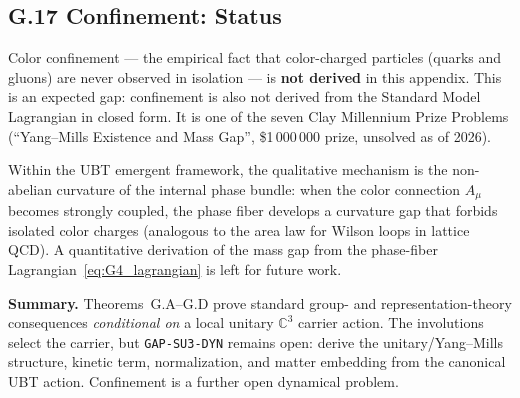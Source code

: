 \subsection*{G.17 Confinement: Status}
\label{sec:G17_confinement}

Color confinement — the empirical fact that color-charged particles (quarks and gluons) are
never observed in isolation — is \textbf{not derived} in this appendix.  This is an expected
gap: confinement is also not derived from the Standard Model Lagrangian in closed form.
It is one of the seven Clay Millennium Prize Problems (``Yang--Mills Existence and Mass Gap'',
\$1\,000\,000 prize, unsolved as of 2026).

Within the UBT emergent framework, the qualitative mechanism is the non-abelian curvature of
the internal phase bundle: when the color connection $A_\mu$ becomes strongly coupled, the
phase fiber develops a curvature gap that forbids isolated color charges (analogous to the
area law for Wilson loops in lattice QCD).  A quantitative derivation of the mass gap from
the phase-fiber Lagrangian~\eqref{eq:G4_lagrangian} is left for future work.

\textbf{Summary.}  Theorems~G.A--G.D prove standard group- and representation-theory consequences \emph{conditional on} a local unitary $\mathbb{C}^3$ carrier action.  The involutions select the carrier, but \texttt{GAP-SU3-DYN} remains open: derive the unitary/Yang--Mills structure, kinetic term, normalization, and matter embedding from the canonical UBT action.  Confinement is a further open dynamical problem.


